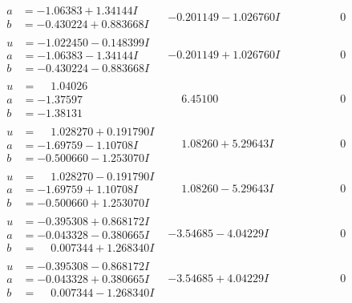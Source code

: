 \documentclass[1p]{elsarticle_modified}
\theoremstyle{definition}
\begin{document}
$$\begin{array}{c|c|c}
\begin{aligned}
a &= -1.06383 + 1.34144 I \\
b &= -0.430224 + 0.883668 I\end{aligned}
 & -0.201149 - 1.026760 I & \phantom{-0.000000 } 0 \\ \hline\begin{aligned}
u &= -1.022450 - 0.148399 I \\
a &= -1.06383 - 1.34144 I \\
b &= -0.430224 - 0.883668 I\end{aligned}
 & -0.201149 + 1.026760 I & \phantom{-0.000000 } 0 \\ \hline\begin{aligned}
u &= \phantom{-}1.04026\phantom{ +0.000000I} \\
a &= -1.37597\phantom{ +0.000000I} \\
b &= -1.38131\phantom{ +0.000000I}\end{aligned}
 & \phantom{-}6.45100\phantom{ +0.000000I} & \phantom{-0.000000 } 0 \\ \hline\begin{aligned}
u &= \phantom{-}1.028270 + 0.191790 I \\
a &= -1.69759 - 1.10708 I \\
b &= -0.500660 - 1.253070 I\end{aligned}
 & \phantom{-}1.08260 + 5.29643 I & \phantom{-0.000000 } 0 \\ \hline\begin{aligned}
u &= \phantom{-}1.028270 - 0.191790 I \\
a &= -1.69759 + 1.10708 I \\
b &= -0.500660 + 1.253070 I\end{aligned}
 & \phantom{-}1.08260 - 5.29643 I & \phantom{-0.000000 } 0 \\ \hline\begin{aligned}
u &= -0.395308 + 0.868172 I \\
a &= -0.043328 - 0.380665 I \\
b &= \phantom{-}0.007344 + 1.268340 I\end{aligned}
 & -3.54685 - 4.04229 I & \phantom{-0.000000 } 0 \\ \hline\begin{aligned}
u &= -0.395308 - 0.868172 I \\
a &= -0.043328 + 0.380665 I \\
b &= \phantom{-}0.007344 - 1.268340 I\end{aligned}
 & -3.54685 + 4.04229 I & \phantom{-0.000000 } 0 \\ \hline\begin{aligned}

\end{aligned}
\end{array}$$
\end{document}

